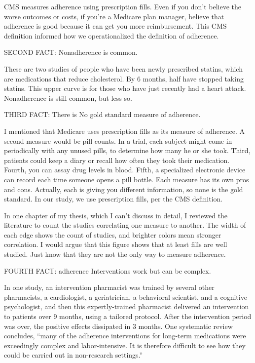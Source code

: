 \documentclass[12pt]{report}
\begin{document}
\begin{large}
CMS measures adherence using prescription fills. Even if you don't
believe the worse outcomes or costs, if you're a Medicare plan
manager, believe that adherence is good because it can get you more
reimbursement. This CMS definition informed how we operationalized the
definition of adherence.

SECOND FACT: Nonadherence is common. %

These are two studies of people who have been newly prescribed
statins, which are medications that reduce cholesterol. By 6 months,
half have stopped taking statins. This upper curve is for those who
have just recently had a heart attack. Nonadherence is still common,
but less so. %

THIRD FACT: There is No gold standard measure of adherence. %

I mentioned that Medicare uses prescription fills as its measure of
adherence. A second measure would be pill counts. In a trial, each
subject might come in periodically with any unused pills, to determine
how many he or she took. Third, patients could keep a diary or recall
how often they took their medication. Fourth, you can assay drug
levels in blood. Fifth, a specialized electronic device can record
each time someone opens a pill bottle. Each measure has its own pros
and cons. Actually, each is giving you different information, so none
is the gold standard. In our study, we use prescription fills, per the
CMS definition. %

In one chapter of my thesis, which I can't discuss in detail, I
reviewed the literature to count the studies correlating one measure
to another. The width of each edge shows the count of studies, and
brighter colors mean stronger correlation. I would argue that this
figure shows that at least fills are well studied. Just know that they
are not the only way to measure adherence. %

FOURTH FACT: adherence Interventions work but can be complex. %

In one study, an intervention pharmacist was trained by several other
pharmacists, a cardiologist, a geriatrician, a behavioral scientist,
and a cognitive psychologist, and then this expertly-trained
pharmacist delivered an intervention to patients over 9 months, using
a tailored protocol. After the intervention period was over, the
positive effects dissipated in 3 months. One systematic review
concludes, ``many of the adherence interventions for long-term
medications were exceedingly complex and labor-intensive. It is
therefore difficult to see how they could be carried out in
non-research settings.''


\end{large}
\end{document}

